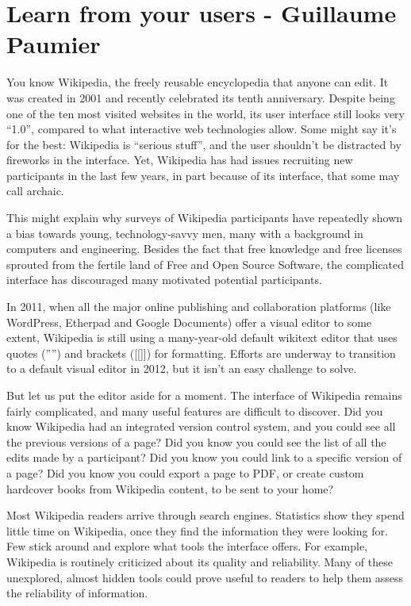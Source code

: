 \section{Learn from your users - Guillaume Paumier}
You know Wikipedia, the freely reusable encyclopedia that anyone can edit. It was created in 2001 and recently celebrated its tenth anniversary. Despite being one of the ten most visited websites in the world, its user interface still looks very ``1.0'', compared to what interactive web technologies allow. Some might say it's for the best: Wikipedia is ``serious stuff'', and the user shouldn't be distracted by fireworks in the interface. Yet, Wikipedia has had issues recruiting new participants in the last few years, in part because of its interface, that some may call archaic.

This might explain why surveys of Wikipedia participants have repeatedly shown a bias towards young, technology-savvy men, many with a background in computers and engineering. Besides the fact that free knowledge and free licenses sprouted from the fertile land of Free and Open Source Software, the complicated interface has discouraged many motivated potential participants.

In 2011, when all the major online publishing and collaboration platforms (like WordPress, Etherpad and Google Documents) offer a visual editor to some extent, Wikipedia is still using a many-year-old default wikitext editor that uses quotes ('''') and brackets ([[]]) for formatting. Efforts are underway to transition to a default visual editor in 2012, but it isn't an easy challenge to solve.

But let us put the editor aside for a moment. The interface of Wikipedia remains fairly complicated, and many useful features are difficult to discover. Did you know Wikipedia had an integrated version control system, and you could see all the previous versions of a page? Did you know you could see the list of all the edits made by a participant? Did you know you could link to a specific version of a page? Did you know you could export a page to PDF, or create custom hardcover books from Wikipedia content, to be sent to your home?

Most Wikipedia readers arrive through search engines. Statistics show they spend little time on Wikipedia, once they find the information they were looking for. Few stick around and explore what tools the interface offers. For example, Wikipedia is routinely criticized about its quality and reliability. Many of these unexplored, almost hidden tools could prove useful to readers to help them assess the reliability of information.

